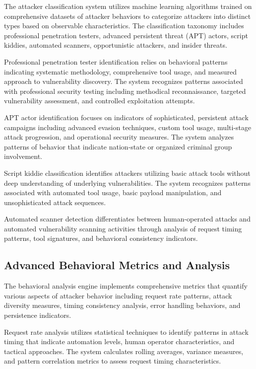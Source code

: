 The attacker classification system utilizes machine learning algorithms trained on comprehensive datasets of attacker behaviors to categorize attackers into distinct types based on observable characteristics. The classification taxonomy includes professional penetration testers, advanced persistent threat (APT) actors, script kiddies, automated scanners, opportunistic attackers, and insider threats.

Professional penetration tester identification relies on behavioral patterns indicating systematic methodology, comprehensive tool usage, and measured approach to vulnerability discovery. The system recognizes patterns associated with professional security testing including methodical reconnaissance, targeted vulnerability assessment, and controlled exploitation attempts.

APT actor identification focuses on indicators of sophisticated, persistent attack campaigns including advanced evasion techniques, custom tool usage, multi-stage attack progression, and operational security measures. The system analyzes patterns of behavior that indicate nation-state or organized criminal group involvement.

Script kiddie classification identifies attackers utilizing basic attack tools without deep understanding of underlying vulnerabilities. The system recognizes patterns associated with automated tool usage, basic payload manipulation, and unsophisticated attack sequences.

Automated scanner detection differentiates between human-operated attacks and automated vulnerability scanning activities through analysis of request timing patterns, tool signatures, and behavioral consistency indicators.

\subsection{Advanced Behavioral Metrics and Analysis}

The behavioral analysis engine implements comprehensive metrics that quantify various aspects of attacker behavior including request rate patterns, attack diversity measures, timing consistency analysis, error handling behaviors, and persistence indicators.

Request rate analysis utilizes statistical techniques to identify patterns in attack timing that indicate automation levels, human operator characteristics, and tactical approaches. The system calculates rolling averages, variance measures, and pattern correlation metrics to assess request timing characteristics.

